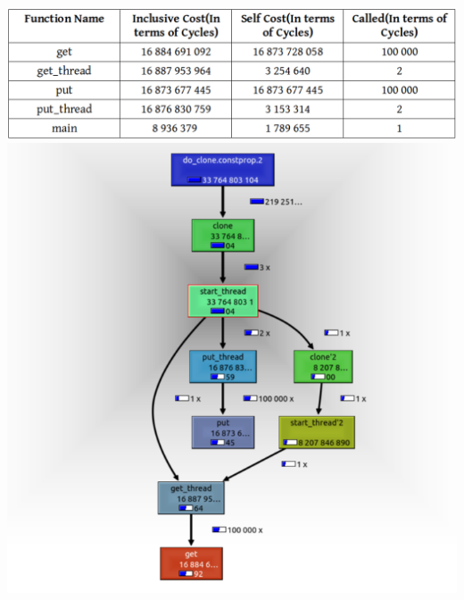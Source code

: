 \documentclass{sem5}
\begin{document}
\begin{enumerate}
\begin{itemize}
\includegraphics[scale=.6]{pic5.png}
\includegraphics[scale=.6]{pic6.png}

\end{itemize}
\end{enumerate}
\end{document}
